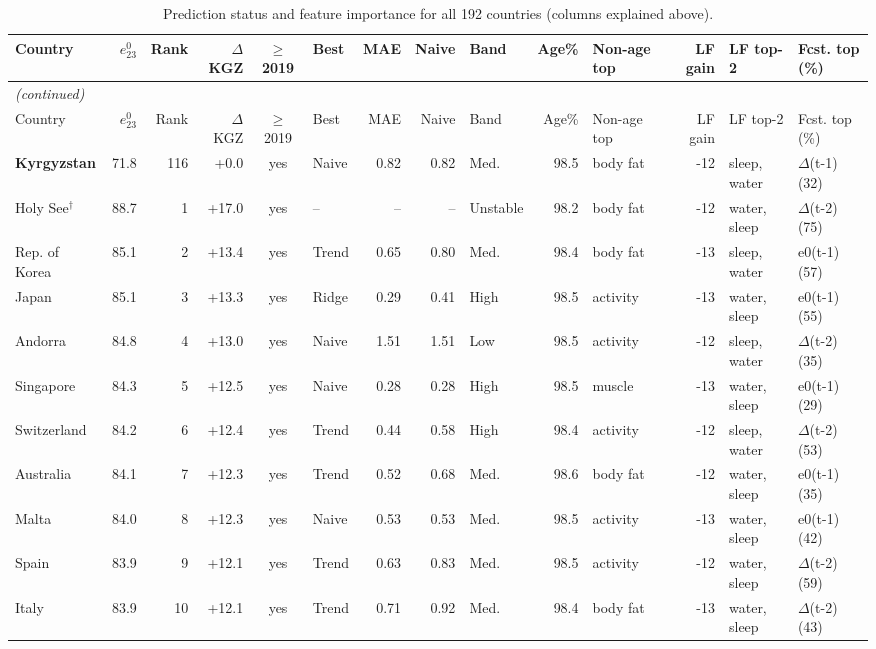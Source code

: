 {\tiny\setlength{\tabcolsep}{4pt}\renewcommand{\arraystretch}{0.85}
\begin{longtable}{l r r r c l r r l r l r l l}
\caption{Prediction status and feature importance for all 192 countries (columns explained above).}\label{tab:app-countries}\\
\toprule
Country & $e^0_{23}$ & Rank & $\Delta$KGZ & $\geq$2019 & Best & MAE & Naive & Band & Age\% & Non-age top & LF gain & LF top-2 & Fcst. top (\%) \\
\midrule
\endfirsthead
\multicolumn{14}{l}{\emph{(continued)}}\\
\toprule
Country & $e^0_{23}$ & Rank & $\Delta$KGZ & $\geq$2019 & Best & MAE & Naive & Band & Age\% & Non-age top & LF gain & LF top-2 & Fcst. top (\%) \\
\midrule
\endhead
\bottomrule
\endfoot
\textbf{Kyrgyzstan} & 71.8 & 116 & +0.0 & yes & Naive & 0.82 & 0.82 & Med. & 98.5 & body fat & -12 & sleep, water & $\Delta$(t-1) (32) \\
Holy See$^\dagger$ & 88.7 & 1 & +17.0 & yes & -- & -- & -- & Unstable & 98.2 & body fat & -12 & water, sleep & $\Delta$(t-2) (75) \\
Rep. of Korea & 85.1 & 2 & +13.4 & yes & Trend & 0.65 & 0.80 & Med. & 98.4 & body fat & -13 & sleep, water & e0(t-1) (57) \\
Japan & 85.1 & 3 & +13.3 & yes & Ridge & 0.29 & 0.41 & High & 98.5 & activity & -13 & water, sleep & e0(t-1) (55) \\
Andorra & 84.8 & 4 & +13.0 & yes & Naive & 1.51 & 1.51 & Low & 98.5 & activity & -12 & sleep, water & $\Delta$(t-2) (35) \\
Singapore & 84.3 & 5 & +12.5 & yes & Naive & 0.28 & 0.28 & High & 98.5 & muscle & -13 & water, sleep & e0(t-1) (29) \\
Switzerland & 84.2 & 6 & +12.4 & yes & Trend & 0.44 & 0.58 & High & 98.4 & activity & -12 & sleep, water & $\Delta$(t-2) (53) \\
Australia & 84.1 & 7 & +12.3 & yes & Trend & 0.52 & 0.68 & Med. & 98.6 & body fat & -12 & water, sleep & e0(t-1) (35) \\
Malta & 84.0 & 8 & +12.3 & yes & Naive & 0.53 & 0.53 & Med. & 98.5 & activity & -13 & water, sleep & e0(t-1) (42) \\
Spain & 83.9 & 9 & +12.1 & yes & Trend & 0.63 & 0.83 & Med. & 98.5 & activity & -12 & water, sleep & $\Delta$(t-2) (59) \\
Italy & 83.9 & 10 & +12.1 & yes & Trend & 0.71 & 0.92 & Med. & 98.4 & body fat & -13 & water, sleep & $\Delta$(t-2) (43) \\

\end{longtable}}
